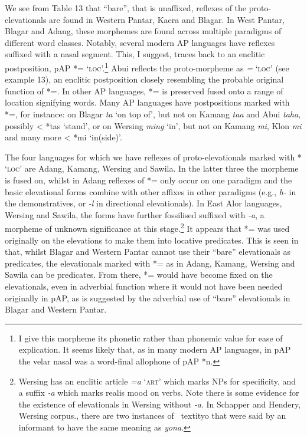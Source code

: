  We see from Table 13 that {\textquotedblleft}bare{\textquotedblright}, that is unaffixed, reflexes of the proto-elevationals are found in Western Pantar, Kaera and Blagar. In West Pantar, Blagar and  Adang, these morphemes are found across multiple paradigms of different word classes. Notably, several modern AP languages have reflexes suffixed with a nasal segment. This, I suggest, traces back to an enclitic postposition, pAP *={\ng} {\textquoteleft}\textsc{loc}{\textquoteright}.\footnote{I give this morpheme its phonetic rather than phonemic value for ease of explication. It seems likely that, as in many modern AP languages, in pAP the velar nasal was a word-final allophone of pAP *n. } Abui reflects the proto-morpheme as \textit{=}\textit{{\ng}} {\textquoteleft}\textsc{loc}{\textquoteright} (see example 13), an enclitic postposition closely resembling the probable original function of *={\ng}. In other AP languages, *={\ng} is preserved fused onto a range of location signifying words. Many AP languages 
have postpositions marked with *={\ng}, for instance: on Blagar \textit{ta}\textit{{\ng}} {\textquoteleft}on top of{\textquoteright}, but not on Kamang \textit{taa }and Abui \textit{taha}, possibly {\textless} *tas {\textquoteleft}stand{\textquoteright}, or on Wersing \textit{ming} {\textquoteleft}in{\textquoteright}, but not on Kamang \textit{mi}, Klon \textit{mi} and many more {\textless} *mi {\textquoteleft}in(side){\textquoteright}. 

The four languages for which we have reflexes of proto-elevationals marked with *{\ng} {\textquoteleft}\textsc{loc}{\textquoteright} are Adang, Kamang, Wersing and Sawila. In the latter three the morpheme is fused on, whilst in Adang reflexes of *={\ng} only occur on one paradigm and the basic elevational forms combine with other affixes in other paradigms (e.g., \textit{h}\textit{{\textepsilon}}\textit{{}-} in the demonstratives, or \textit{{}-l}\textit{{\textepsilon}} in directional elevationals). In East Alor languages, Wersing and Sawila, the forms have further fossilised suffixed with \textit{{}-a}, a morpheme of unknown significance at this stage.\footnote{Wersing has an enclitic article \textit{=a} {\textquoteleft}\textsc{art}{\textquoteright} which marks NPs for specificity, and a suffix \textit{{}-a} which marks realis mood on verbs. Note there is some evidence for the existence of elevationals in Wersing without \textit{{}-a}. In Schapper and Hendery, Wersing corpus., there are two instances of \
textit{yo{\ng}} that were said by an informant to have the same meaning as \textit{yona}.} It appears that *={\ng} was used originally on the elevations to make them into locative predicates. This is seen in that, whilst Blagar and Western Pantar cannot use their {\textquotedblleft}bare{\textquotedblright} elevationals as predicates, the elevationals marked with *={\ng} as in Adang, Kamang, Wersing and Sawila can be predicates. From there, *={\ng} would have become fixed on the elevationals, even in adverbial function where it would not have been needed originally in pAP, as is suggested by the adverbial use of {\textquotedblleft}bare{\textquotedblright} elevationals in Blagar and Western Pantar.

